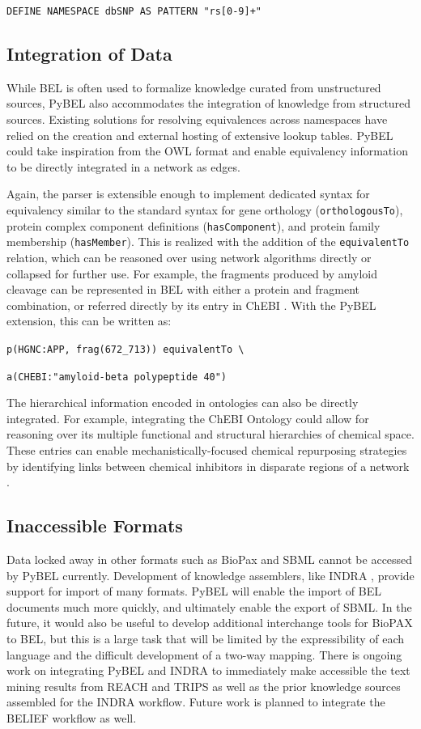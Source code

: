 \verb|DEFINE NAMESPACE dbSNP AS PATTERN "rs[0-9]+"|

\subsection{Integration of Data}

While \ac{BEL} is often used to formalize knowledge curated from unstructured sources, PyBEL also accommodates the integration of knowledge from structured sources. Existing solutions for resolving equivalences across namespaces have relied on the creation and external hosting of extensive lookup tables. PyBEL could take inspiration from the \ac{OWL} format and enable equivalency information to be directly integrated in a network as edges. 

Again, the parser is extensible enough to implement dedicated syntax for equivalency similar to the standard syntax for gene orthology (\verb|orthologousTo|), protein complex component definitions (\verb|hasComponent|), and protein family membership (\verb|hasMember|). This is realized with the addition of the \verb|equivalentTo| relation, which can be reasoned over using network algorithms directly or collapsed for further use. For example, the fragments produced by amyloid cleavage can be represented in \ac{BEL} with either a protein and fragment combination, or referred directly by its entry in \ac{ChEBI} \cite{Hastings2013}. With the PyBEL extension, this can be written as:

\verb|p(HGNC:APP, frag(672_713)) equivalentTo \|

\verb|a(CHEBI:"amyloid-beta polypeptide 40")|

The hierarchical information encoded in ontologies can also be directly integrated. For example, integrating the \ac{ChEBI} Ontology could allow for reasoning over its multiple functional and structural hierarchies of chemical space. These entries can enable mechanistically-focused chemical repurposing strategies by identifying links between chemical inhibitors in disparate regions of a network \cite{Hastings2013}. 

\subsection{Inaccessible Formats}

Data locked away in other formats such as BioPax and SBML cannot be accessed by PyBEL currently. Development of knowledge assemblers, like \ac{INDRA} \cite{indra}, provide support for import of many formats. PyBEL will enable the import of \ac{BEL} documents much more quickly, and ultimately enable the export of \ac{SBML}. In the future, it would also be useful to develop additional interchange tools for \ac{BioPAX} to \ac{BEL}, but this is a large task that will be limited by the expressibility of each language and the difficult development of a two-way mapping.
There is ongoing work on integrating PyBEL and \ac{INDRA} to immediately make accessible the text mining results from REACH \cite{Valenzuela-Escarcega2015} and TRIPS \cite{Allen2008} as well as the prior knowledge sources assembled for the \ac{INDRA} workflow. Future work is planned to integrate the \ac{BELIEF} workflow \cite{Madan2016} as well.

